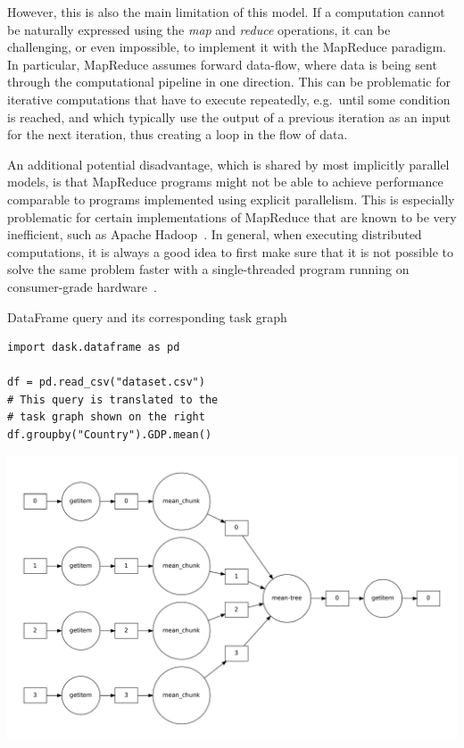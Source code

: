 However, this is also the main limitation of this model. If a computation cannot be naturally
expressed using the \emph{map} and \emph{reduce} operations, it can
be challenging, or even impossible, to implement it with the MapReduce paradigm. In particular,
MapReduce assumes forward data-flow, where data is being sent through the computational pipeline in
one direction. This can be problematic for iterative computations that have to execute repeatedly,
e.g.\ until some condition is reached, and which typically use the output of a previous iteration
as an input for the next iteration, thus creating a loop in the flow of data.

An additional potential disadvantage, which is shared by most implicitly parallel models, is that
MapReduce programs might not be able to achieve performance comparable to programs implemented
using explicit parallelism. This is especially problematic for certain implementations of MapReduce
that are known to be very inefficient, such as Apache Hadoop~\cite{hadoop}. In
general, when executing distributed computations, it is always a good idea to first make sure that
it is not possible to solve the same problem faster with a single-threaded program running on
consumer-grade hardware~\cite{cost}.

\begin{listing}[h]
	\caption{\dask{} DataFrame query and its corresponding task graph}
	\label{lst:dask-dataframe-example-1}
	\begin{minipage}{.4\linewidth}
		\begin{verbatim}
import dask.dataframe as pd

df = pd.read_csv("dataset.csv")
# This query is translated to the
# task graph shown on the right
df.groupby("Country").GDP.mean()
	\end{verbatim}
	\end{minipage}
	\begin{minipage}{.6\linewidth}
		\includegraphics[width=\linewidth]{imgs/dask-dataframe-1-graph}
	\end{minipage}
\end{listing}

